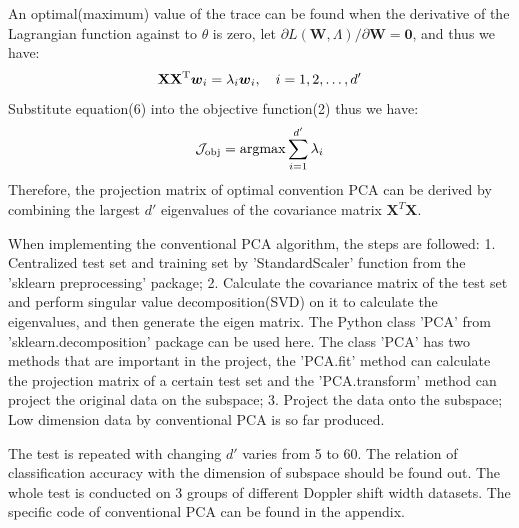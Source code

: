 \documentclass{cta-author}
\begin{document}
An optimal(maximum) value of the trace can be found when the derivative of the Lagrangian function against to $\theta$ is zero, let $\partial L(\mathbf{W}, \Lambda)/\partial \mathbf{W}=\mathbf{0}$, and thus we have:
\begin{equation}
\centering
\begin{split}
\mathbf{X X}^{\mathrm{T}} \boldsymbol{w}_i=\lambda_i \boldsymbol{w}_i, \quad i=1,2, \ldots, d^{\prime}
\end{split}
\label{eq:mi}
\end{equation}
Substitute equation(6) into the objective function(2) thus we have:
\begin{equation}
\centering
\begin{split}
\mathcal{J}_{\mathrm{obj}}= \mathrm{argmax} \sum_{i=1}^{d^{\prime}} \lambda_i
\end{split}
\label{eq:mi}
\end{equation}
Therefore, the projection matrix of optimal convention PCA can be derived by combining the largest $d'$ eigenvalues of the covariance matrix $\boldsymbol{X}^T\boldsymbol{X}$.

When implementing the conventional PCA algorithm, the steps are followed:
1. Centralized test set and training set by 'StandardScaler' function from the 'sklearn preprocessing' package; 2. Calculate the covariance matrix of the test set and perform singular value decomposition(SVD) on it to calculate the eigenvalues, and then generate the eigen matrix. The Python class 'PCA' from 'sklearn.decomposition' package can be used here. The class 'PCA' has two methods that are important in the project, the 'PCA.fit' method can calculate the projection matrix of a certain test set and the 'PCA.transform' method can project the original data on the subspace; 3. Project the data onto the subspace;
Low dimension data by conventional PCA is so far produced.

The test is repeated with changing $d'$ varies from 5 to 60. The relation of classification accuracy with the dimension of subspace should be found out. The whole test is conducted on 3 groups of different Doppler shift width datasets. The specific code of conventional PCA can be found in the appendix.
\end{document}
